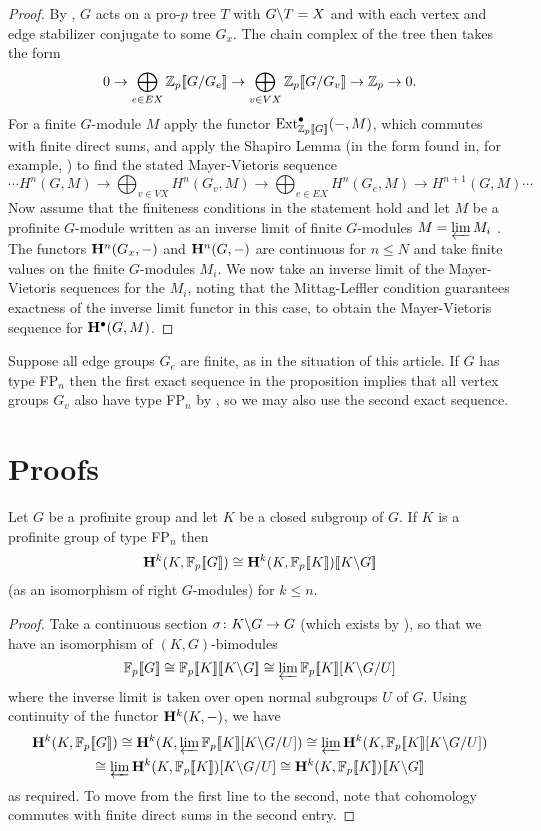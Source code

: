 \documentclass[draft, a4paper]{article}
\begin{document}
\begin{proof}
By \cite[Theorem 6.3.5]{Ribes17}, $G$ acts on a pro-$p$ tree $T$ with $G\lqt T=X$ and with each vertex and edge stabilizer conjugate to some $G_x$. The chain complex of the tree \cite[Section 2.4]{Ribes17} then takes the form
\[0\to \bigoplus_{e\in EX} \Zpof{G/G_e}\to \bigoplus_{v\in VX}\Zpof{G/G_v} \to \Z[p]\to 0.\]
For a finite $G$-module $M$ apply the functor $\Ext^\bullet_\Zpof{G}(-,M)$, which commutes with finite direct sums, and apply the Shapiro Lemma (in the form found in, for example, \cite[Proposition 1.23]{Wilkes19RelCoh}) to find the stated Mayer-Vietoris sequence
\[\cdots H^n(G,M)\to \bigoplus_{v\in VX}H^n(G_v,M)\to \bigoplus_{e\in EX}H^n(G_e,M)\to H^{n+1}(G,M)\cdots\]
Now assume that the finiteness conditions in the statement hold and let $M$ be a profinite $G$-module written as an inverse limit of finite $G$-modules $M=\varprojlim M_i$ \cite[Lemma 5.5.3(c)]{RZ00}. The functors ${\bf H}^n(G_x, -)$ and ${\bf H}^n(G,-)$ are continuous for $n\leq N$ and take finite values on the finite $G$-modules $M_i$. We now take an inverse limit of the Mayer-Vietoris sequences for the $M_i$, noting that the Mittag-Leffler condition guarantees exactness of the inverse limit functor in this case, to obtain the Mayer-Vietoris sequence for ${\bf H}^\bullet(G,M)$.
\end{proof}
\begin{rmk}
Suppose all edge groups $G_e$ are finite, as in the situation of this article. If $G$ has type FP${}_n$ then the first exact sequence in the proposition implies that all vertex groups $G_v$ also have type FP${}_n$ by \cite[Proposition 4.2.3]{SW00}, so we may also use the second exact sequence.
\end{rmk}
\section{Proofs}
\begin{prop}\label{prop:infdirsums}
Let $G$ be a profinite group and let $K$ be a closed subgroup of $G$. If $K$ is a profinite group of type FP$_n$ then 
\[{\bf H}^k(K, \Fpof{G}) \iso {\bf H}^k(K, \Fpof{K})[\![K\lqt G]\!]\]
(as an isomorphism of right $G$-modules) for $k\leq n$.
\end{prop}
\begin{proof}
Take a continuous section $\sigma\colon K\lqt G\to G$ (which exists by \cite[Proposition 2.2.2]{RZ00}), so that we have \cite[Proposition 5.7.1]{RZ00} an isomorphism of $(K,G)$-bimodules 
\[\Fpof{G} \iso \Fpof{K}[\![K\lqt G]\!]\iso \varprojlim \Fpof{K}[K\lqt G/U]\]
where the inverse limit is taken over open normal subgroups $U$ of $G$. Using continuity of the functor ${\bf H}^k(K,-)$, we have
\begin{multline*}{\bf H}^k(K, \Fpof{G}) \iso {\bf H}^k(K,\varprojlim \Fpof{K}[K\lqt G/U])\iso \varprojlim {\bf H}^k(K,\Fpof{K}[K\lqt G/U])\\
\iso \varprojlim {\bf H}^k(K,\Fpof{K})[K\lqt G/U] \iso {\bf H}^k(K, \Fpof{K})[\![K\lqt G]\!] 
 \end{multline*}
as required. To move from the first line to the second,  note that cohomology commutes with finite direct sums in the second entry. 
\end{proof}
\end{document}
